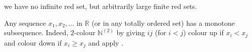 \documentclass{article}
\newcommand{\red}[1]{\textcolor{bred}{#1}}
\newcommand{\blue}[1]{\textcolor{bblue}{#1}}
\begin{document}
\begin{remark}
\begin{enumerate}[(i)]
\begin{center}
        \end{center}
  we have no infinite red set, but arbitrarily large finite red sets.
  \end{enumerate}
\end{remark}
\begin{eg}
  Any sequence $x_1, x_2, \dotsc$ in $\mathbb{R}$ (or in any totally ordered set) has a monotone subsequence.
  Indeed, 2-colour $\mathbb{N}^{(2)}$ by giving $ij$ (for $i<j$) colour \red{up} if $x_i < x_j$ and colour \blue{down} if $x_i \geq x_j$ and apply .
\end{eg}
\printindex
\end{document}
